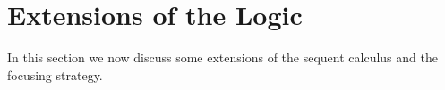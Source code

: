 \documentclass[submission,copyright,creativecommons]{eptcs}
\theoremstyle{definition}
\newcommand{\ot}{\otimes}
\newcommand{\RI}{\mathsf{RI}}
\newcommand{\LI}{\mathsf{LI}}
\newcommand{\tCone}{\mathbb{C}_1}
\newcommand{\tCtwo}{\mathbb{C}_2}
\newcommand{\tE}{\mathbb{R}}
\newcommand{\tT}{\mathbb{T}}
\newcommand{\topr}{\top \mathsf{R}}
\newcommand{\botl}{\bot \mathsf{L}}
\begin{document}
\section{Extensions of the Logic}\label{sec:extensions}
In this section we now discuss some extensions of the sequent calculus and the focusing strategy.




\end{document}
